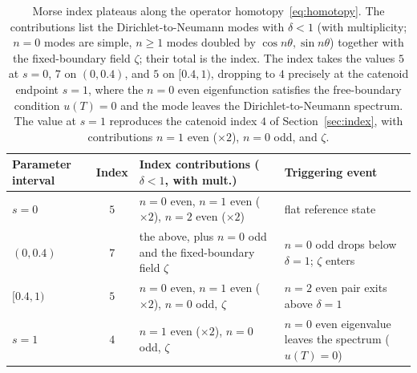 \documentclass[11pt]{article}
\theoremstyle{definition}
\theoremstyle{plain}
\begin{document}
\begin{table}[ht]
	\centering
	\begin{tabular}{p{2.4cm}cp{4.7cm}p{3.9cm}}
		\hline
		\textbf{Parameter interval} & \textbf{Index} & \textbf{Index contributions ($\delta < 1$, with mult.)}            & \textbf{Triggering event}                                \\
		\hline
		$s = 0$                     & $5$            & $n{=}0$ even, $n{=}1$ even ($\times 2$), $n{=}2$ even ($\times 2$) & flat reference state                                     \\
		$(0, 0.4)$                  & $7$            & the above, plus $n{=}0$ odd and the fixed-boundary field $\zeta$   & $n{=}0$ odd drops below $\delta{=}1$; $\zeta$ enters     \\
		$[0.4, 1)$                  & $5$            & $n{=}0$ even, $n{=}1$ even ($\times 2$), $n{=}0$ odd, $\zeta$      & $n{=}2$ even pair exits above $\delta{=}1$               \\
		$s = 1$                     & $4$            & $n{=}1$ even ($\times 2$), $n{=}0$ odd, $\zeta$                    & $n{=}0$ even eigenvalue leaves the spectrum ($u(T){=}0$) \\
		\hline
	\end{tabular}
	\caption{Morse index plateaus along the operator homotopy~\eqref{eq:homotopy}. The contributions list the Dirichlet-to-Neumann modes with $\delta < 1$ (with multiplicity; $n = 0$ modes are simple, $n \geq 1$ modes doubled by $\cos n\theta, \sin n\theta$) together with the fixed-boundary field $\zeta$; their total is the index. The index takes the values $5$ at $s = 0$, $7$ on $(0, 0.4)$, and $5$ on $[0.4, 1)$, dropping to $4$ precisely at the catenoid endpoint $s = 1$, where the $n{=}0$ even eigenfunction satisfies the free-boundary condition $u(T) = 0$ and the mode leaves the Dirichlet-to-Neumann spectrum. The value at $s = 1$ reproduces the catenoid index $4$ of Section~\ref{sec:index}, with contributions $n{=}1$ even ($\times 2$), $n{=}0$ odd, and $\zeta$.}
	\label{tab:plateau}
\end{table}
\end{document}
